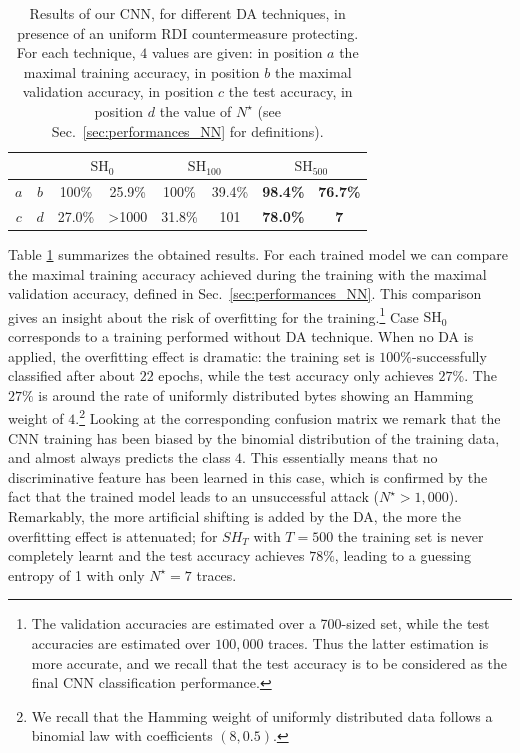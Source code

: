 \begin{table}[t]
\centering
\caption{Results of our CNN, for different DA techniques, in presence of an uniform RDI countermeasure protecting. For each technique, $4$ values are given: in position $a$ the maximal training accuracy, in position $b$ the maximal validation accuracy, in position $c$ the test accuracy, in position $d$ the value of $N^\star$ (see Sec.~\ref{sec:performances_NN} for definitions).}
\label{tab:res_CW_shift}
\begin{tabular}{|c|c|c|c|c|c|c|c|}
\hline
\multicolumn{2}{|c|}{} & \multicolumn{2}{c|}{$\mathrm{SH}_{0}$}                                    & \multicolumn{2}{c|}{$\mathrm{SH}_{100}$} & \multicolumn{2}{c|}{$\mathrm{SH}_{500}$} \\ \hline
$a$        & $b$       & \cellcolor[HTML]{EFEFEF}100\%  & \cellcolor[HTML]{EFEFEF}25.9\%           & 100\%               & 39.4\%             & \textbf{98.4\%}     & \textbf{76.7\%}    \\ \hline
$c$        & $d$       & \cellcolor[HTML]{EFEFEF}27.0\% & \cellcolor[HTML]{EFEFEF}\textgreater1000 & 31.8\%              & 101                & \textbf{78.0\%}     & \textbf{7}         \\ \hline
\end{tabular}
\end{table}

Table \ref{tab:res_CW_shift} summarizes the obtained results.  For each trained model we can compare the maximal training accuracy achieved during the training with the maximal validation accuracy, defined in Sec.~\ref{sec:performances_NN}.  This comparison gives an insight about the risk of overfitting for the training.\footnote{The validation accuracies are estimated over a 700-sized set, while the test accuracies are estimated over $100,000$ traces. Thus the latter estimation is more accurate, and we recall that the test accuracy is to be considered as the final CNN classification performance.} Case $\mathrm{SH}_0$ corresponds to a training performed without DA technique. When no DA is applied, the overfitting effect is dramatic: the training set is $100\%$-successfully classified after about $22$ epochs, while the test accuracy only achieves $27\%$. The $27\%$ is around the rate of uniformly distributed bytes showing an Hamming weight of $4$.\footnote{We recall that the Hamming weight of uniformly distributed data follows a binomial law with coefficients $(8,0.5)$.} Looking at the corresponding confusion matrix we remark that the CNN training has been biased by the binomial distribution of the training data, and almost always predicts the class $4$. This essentially means that no discriminative feature has been learned in this case, which is confirmed by the fact that the trained model leads to an unsuccessful attack ($N^\star>1,000$). Remarkably, the more artificial shifting is added by the DA, the more the overfitting effect is attenuated; for $SH_T$ with \eg $T=500$ the training set is never completely learnt and the test accuracy achieves $78\%$, leading to a guessing entropy of 1 with only $N^{\star}=7$ traces. \\

